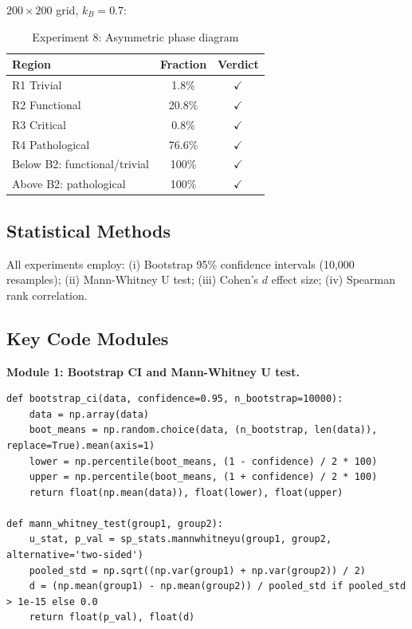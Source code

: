 \documentclass[12pt,a4paper]{article}
\theoremstyle{definition}
\begin{document}
$200 \times 200$ grid, $k_B = 0.7$:

\begin{table}[htbp]
\centering
\caption{Experiment 8: Asymmetric phase diagram}
\label{tab:exp8-en}
\begin{tabular}{lcc}
\toprule
Region & Fraction & Verdict \\
\midrule
R1 Trivial & 1.8\% & $\checkmark$ \\
R2 Functional & 20.8\% & $\checkmark$ \\
R3 Critical & 0.8\% & $\checkmark$ \\
R4 Pathological & 76.6\% & $\checkmark$ \\
\midrule
Below B2: functional/trivial & 100\% & $\checkmark$ \\
Above B2: pathological & 100\% & $\checkmark$ \\
\bottomrule
\end{tabular}
\end{table}

\subsection{Statistical Methods}

All experiments employ: (i) Bootstrap 95\% confidence intervals (10,000 resamples); (ii) Mann-Whitney U test; (iii) Cohen's $d$ effect size; (iv) Spearman rank correlation.

\subsection{Key Code Modules}

\textbf{Module 1: Bootstrap CI and Mann-Whitney U test.}
\begin{lstlisting}[caption={Statistical utility functions}, label={lst:stats-en}]
def bootstrap_ci(data, confidence=0.95, n_bootstrap=10000):
    data = np.array(data)
    boot_means = np.random.choice(data, (n_bootstrap, len(data)), replace=True).mean(axis=1)
    lower = np.percentile(boot_means, (1 - confidence) / 2 * 100)
    upper = np.percentile(boot_means, (1 + confidence) / 2 * 100)
    return float(np.mean(data)), float(lower), float(upper)

def mann_whitney_test(group1, group2):
    u_stat, p_val = sp_stats.mannwhitneyu(group1, group2, alternative='two-sided')
    pooled_std = np.sqrt((np.var(group1) + np.var(group2)) / 2)
    d = (np.mean(group1) - np.mean(group2)) / pooled_std if pooled_std > 1e-15 else 0.0
    return float(p_val), float(d)
\end{lstlisting}
\end{document}
